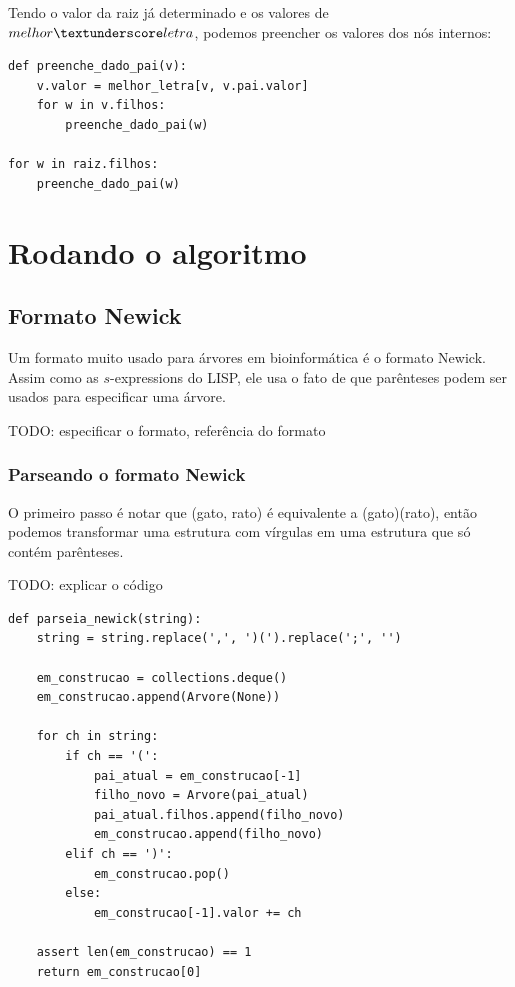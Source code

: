 \documentclass[11pt]{article}
\newcommand{\tu}{\textunderscore}
\begin{document}
Tendo o valor da raiz já determinado e os valores de $melhor \tu
letra$, podemos preencher os valores dos nós internos:

\begin{verbatim}
def preenche_dado_pai(v):
    v.valor = melhor_letra[v, v.pai.valor]
    for w in v.filhos:
        preenche_dado_pai(w)

for w in raiz.filhos:
    preenche_dado_pai(w)
\end{verbatim}


\section{Rodando o algoritmo}
\label{sec-3}

\subsection{Formato Newick}
\label{sec-3-1}

Um formato muito usado para árvores em bioinformática é o formato
Newick. Assim como as $s$-expressions do LISP, ele usa o fato de que
parênteses podem ser usados para especificar uma árvore.

TODO: especificar o formato, referência do formato

\subsubsection{Parseando o formato Newick}
\label{sec-3-1-1}

O primeiro passo é notar que (gato, rato) é equivalente a
(gato)(rato), então podemos transformar uma estrutura com vírgulas
em uma estrutura que só contém parênteses.

TODO: explicar o código
\begin{verbatim}
def parseia_newick(string):
    string = string.replace(',', ')(').replace(';', '')

    em_construcao = collections.deque()
    em_construcao.append(Arvore(None))

    for ch in string:
        if ch == '(':
            pai_atual = em_construcao[-1]
            filho_novo = Arvore(pai_atual)
            pai_atual.filhos.append(filho_novo)
            em_construcao.append(filho_novo)
        elif ch == ')':
            em_construcao.pop()
        else:
            em_construcao[-1].valor += ch

    assert len(em_construcao) == 1
    return em_construcao[0]
\end{verbatim}
\end{document}
